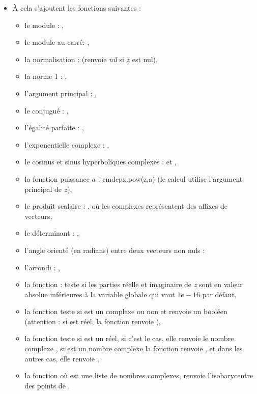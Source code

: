 \begin{itemize}
    \item À cela s'ajoutent les fonctions suivantes :
  \begin{itemize}
  \item le module : ,
  \item le module au carré: ,
  \item la normalisation :  (renvoie \emph{nil} si $z$ est nul),
  \item la norme 1 : ,
  \item l'argument principal : ,
  \item le conjugué : ,
  \item l'égalité parfaite : ,
  \item l'exponentielle complexe : ,
  \item le cosinus et sinus hyperboliques complexes :  et ,
  \item la fonction puissance $a$ : cmd{cpx.pow(z,a)} (le calcul utilise l'argument principal de $z$),
  \item le produit scalaire : , où les complexes représentent des affixes de vecteurs,
  \item le déterminant : ,
  \item l'angle orienté (en radians) entre deux vecteurs non nuls : 
  \item l'arrondi : ,
  \item la fonction :  teste si les parties réelle et imaginaire de \emph{z} sont en valeur absolue inférieures à la variable globale  qui vaut $1e-16$ par défaut,
  \item la fonction  teste si  est un complexe ou non et renvoie un booléen (attention : si  est réel, la fonction renvoie \false),
  \item la fonction  teste si  est un réel, si c'est le cas, elle renvoie le nombre complexe , si  est un nombre complexe la fonction renvoie , et dans les autres cas, elle renvoie \nil,
  \item la fonction  où  est une liste de nombres complexes, renvoie l'isobarycentre des points de .
  \end{itemize}
\end{itemize}

